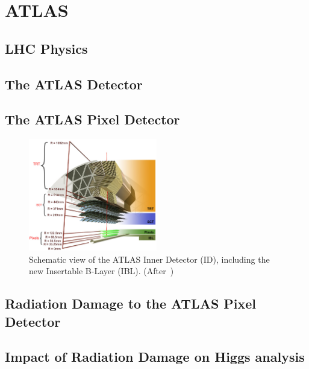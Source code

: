 \chapter{ATLAS}
\label{chap:ATLAS}

\section{LHC Physics}

\section{The ATLAS Detector}

\section{The ATLAS Pixel Detector}


\begin{figure}[!htbp]
\centering
\includegraphics[width=0.5\textwidth]{ATLAS_ID.png}
\caption{\label{fig:ATLASID}Schematic view of the  ATLAS Inner Detector (ID), including the new Insertable B-Layer (IBL). (After~\cite{Potamianos:2016ptf})}
\end{figure}


\section{Radiation Damage to the ATLAS Pixel Detector}
\label{sec:digitizer}

\section{Impact of Radiation Damage on Higgs analysis}